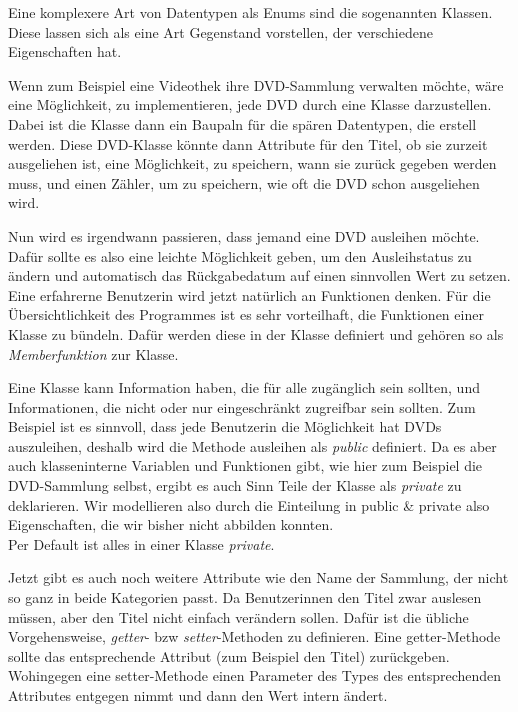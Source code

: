 
Eine komplexere Art von Datentypen als Enums sind die sogenannten Klassen. Diese lassen sich als eine Art Gegenstand vorstellen, der verschiedene Eigenschaften hat.

Wenn zum Beispiel eine Videothek ihre DVD-Sammlung verwalten möchte, wäre eine Möglichkeit, zu implementieren, jede DVD durch eine Klasse darzustellen. Dabei ist die Klasse dann ein Baupaln für die spären Datentypen, die erstell werden. Diese DVD-Klasse könnte dann Attribute für den Titel, ob sie zurzeit ausgeliehen ist, eine Möglichkeit, zu speichern, wann sie zurück gegeben werden muss, und einen Zähler, um zu speichern, wie oft die DVD schon ausgeliehen wird.

Nun wird es irgendwann passieren, dass jemand eine DVD ausleihen möchte. Dafür sollte es also eine leichte Möglichkeit geben, um den Ausleihstatus zu ändern und automatisch das Rückgabedatum auf einen sinnvollen Wert zu setzen.
Eine erfahrerne Benutzerin wird jetzt natürlich an Funktionen denken. Für die
Übersichtlichkeit des Programmes ist es sehr vorteilhaft, die Funktionen einer
Klasse zu bündeln. Dafür werden diese in der Klasse definiert und gehören so als
\emph{Memberfunktion} zur Klasse.


Eine Klasse kann Information haben, die für alle zugänglich sein sollten, und Informationen, die nicht oder nur eingeschränkt zugreifbar sein sollten. Zum Beispiel ist es sinnvoll, dass jede Benutzerin die Möglichkeit hat DVDs auszuleihen, deshalb wird die Methode ausleihen als \emph{public} definiert.
Da es aber auch klasseninterne Variablen und Funktionen gibt, wie hier zum
Beispiel die DVD-Sammlung selbst, ergibt es auch Sinn Teile der Klasse als
\emph{private} zu deklarieren. Wir modellieren also durch die Einteilung in public \&
private also Eigenschaften, die wir bisher nicht abbilden konnten. \\
Per Default ist alles in einer Klasse \emph{private}.

Jetzt gibt es auch noch weitere Attribute wie den Name der Sammlung, der nicht
so ganz in beide Kategorien passt. Da Benutzerinnen den Titel zwar auslesen müssen, aber den Titel nicht einfach verändern sollen. Dafür ist die übliche Vorgehensweise, \emph{getter}- bzw \emph{setter}-Methoden zu definieren. Eine getter-Methode sollte das entsprechende Attribut (zum Beispiel den Titel) zurückgeben. Wohingegen eine setter-Methode einen Parameter des Types des entsprechenden Attributes entgegen nimmt und dann den Wert intern ändert.

